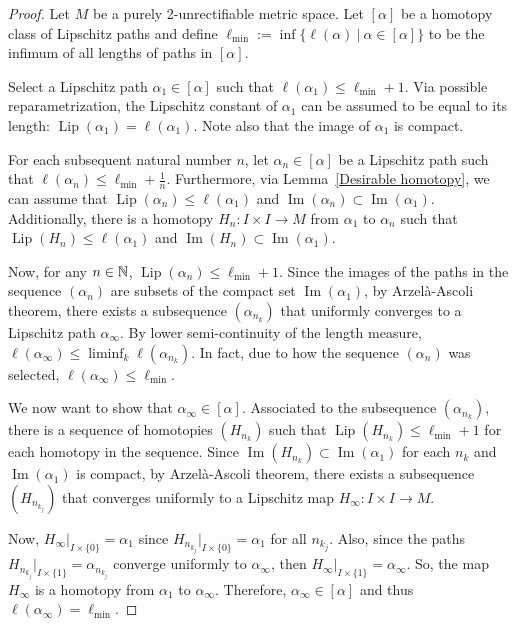 \documentclass{article}
\theoremstyle{definition}
\theoremstyle{remark}
\def\deq{:=}
\DeclareMathOperator{\Ima}{Im}
\newcommand{\length}[1]{\ell}%
\def\lmin{\ell_{\text{min}}}
\newcommand{\core}[1]{{#1}_\infty}
\DeclareMathOperator{\Lip}{Lip}
\begin{document}
\begin{proof}

Let $M$ be a purely 2-unrectifiable metric space. Let $[\alpha]$ be a homotopy class of Lipschitz paths and define $\lmin\deq\inf\{\length{M}(\alpha)~|~\alpha\in[\alpha]\}$ to be the infimum of all lengths of paths in $[\alpha]$. 

Select a Lipschitz path $\alpha_1\in[\alpha]$ such that $\length{M}(\alpha_1)\leq\lmin+1$. Via possible reparametrization, the Lipschitz constant of $\alpha_1$ can be assumed to be equal to its length: $\Lip(\alpha_1)=\length{M}(\alpha_1)$. Note also that the image of $\alpha_1$ is compact. 

For each subsequent natural number $n$, let $\alpha_n\in[\alpha]$ be a Lipschitz path such that $\length{M}(\alpha_n)\leq\lmin+\frac{1}{n}$. Furthermore, via Lemma~\ref{Desirable homotopy}, we can assume that $\Lip(\alpha_n)\leq\length{M}(\alpha_1)$ and $\Ima(\alpha_n)\subset\Ima(\alpha_1)$. Additionally, there is a homotopy $H_n:I\times I\rightarrow M$ from $\alpha_1$ to $\alpha_n$ such that $\Lip(H_n)\leq\length{M}(\alpha_1)$ and $\Ima(H_n)\subset\Ima(\alpha_1)$.  


Now, for any $n\in\mathbb N$, $\Lip(\alpha_n)\leq\lmin+1$. Since the images of the paths in the sequence $(\alpha_n)$ are subsets of the compact set $\Ima(\alpha_1)$, by Arzel\`{a}-Ascoli theorem, there exists a subsequence $(\alpha_{n_k})$ that uniformly converges to a Lipschitz path $\core{\alpha}$. By lower semi-continuity of the length measure, $\length{M}(\core{\alpha})\leq\liminf_k\length{M}(\alpha_{n_k})$. In fact, due to how the sequence $(\alpha_n)$ was selected, $\length{M}(\core{\alpha})\leq\lmin$. 

We now want to show that $\core{\alpha}\in[\alpha]$. Associated to the subsequence $(\alpha_{n_k})$, there is a sequence of homotopies $(H_{n_k})$ such that $\Lip(H_{n_k})\leq\lmin+1$ for each homotopy in the sequence. %
Since $\Ima(H_{n_k})\subset\Ima(\alpha_1)$ for each $n_k$ and $\Ima(\alpha_1)$ is compact, by Arzel\`{a}-Ascoli theorem, there exists a subsequence $(H_{n_{k_j}})$ that converges uniformly to a Lipschitz map $\core{H}:I\times I\rightarrow M$. 

Now, $\core{H}|_{I\times\{0\}}=\alpha_1$ since $H_{n_{k_j}}|_{I\times\{0\}}=\alpha_1$ for all $n_{k_j}$. Also, since the paths $H_{n_{k_j}}|_{I\times\{1\}}=\alpha_{n_{k_j}}$ converge uniformly to $\core{\alpha}$, then $\core{H}|_{I\times\{1\}}=\core{\alpha}$. So, the map $\core{H}$ is a homotopy from $\alpha_1$ to $\core{\alpha}$. Therefore, $\core{\alpha}\in[\alpha]$ and thus $\length{M}(\core{\alpha})=\lmin$.

\end{proof}
\end{document}
